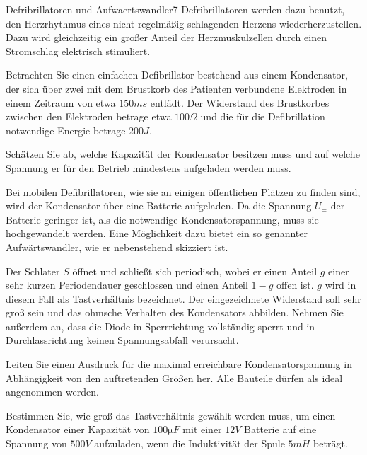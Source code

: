 \begin{problem}{Defribrillatoren und Aufwaertswandler}{7}
 Defribrillatoren werden dazu benutzt, den Herzrhythmus eines nicht regelmäßig schlagenden Herzens wiederherzustellen.  Dazu wird gleichzeitig ein großer Anteil der Herzmuskulzellen durch einen Stromschlag elektrisch stimuliert.

Betrachten Sie einen einfachen Defibrillator bestehend aus einem Kondensator, der sich über zwei mit dem Brustkorb des Patienten verbundene Elektroden in einem Zeitraum von etwa $150\unit{ms}$ entlädt.  Der Widerstand des Brustkorbes zwischen den Elektroden betrage etwa $100\unit{\Omega}$ und die für die Defibrillation notwendige Energie betrage $200\unit{J}$.

\begin{abcenum}
\item Schätzen Sie ab, welche Kapazität der Kondensator besitzen muss und auf welche Spannung er für den Betrieb mindestens aufgeladen werden muss.
\end{abcenum}

Bei mobilen Defibrillatoren, wie sie an einigen öffentlichen Plätzen zu finden sind, wird der Kondensator über eine Batterie aufgeladen.  Da die Spannung $U_=$ der Batterie geringer ist, als die notwendige Kondensatorspannung, muss sie hochgewandelt werden.  Eine Möglichkeit dazu bietet ein so genannter Aufwärtswandler, wie er nebenstehend skizziert ist.

Der Schlater $S$ öffnet und schließt sich periodisch, wobei er einen Anteil $g$ einer sehr kurzen Periodendauer geschlossen und einen Anteil $1-g$ offen ist.  $g$ wird in diesem Fall als Tastverhältnis bezeichnet.  Der eingezeichnete Widerstand soll sehr groß sein und das ohmsche Verhalten des Kondensators abbilden.  Nehmen Sie außerdem an, dass die Diode in Sperrrichtung vollständig sperrt und in Durchlassrichtung keinen Spannungsabfall verursacht.

\begin{abcenum}
  \item Leiten Sie einen Ausdruck für die maximal erreichbare Kondensatorspannung in Abhängigkeit von den auftretenden Größen her.  Alle Bauteile dürfen als ideal angenommen werden.
\item Bestimmen Sie, wie groß das Tastverhältnis gewählt werden muss, um einen Kondensator einer Kapazität von $100\unit{\micro F}$ mit einer $12\unit{V}$ Batterie auf eine Spannung von $500\unit{V}$ aufzuladen, wenn die Induktivität der Spule $5\unit{mH}$ beträgt.
\end{abcenum}

\end{problem}

